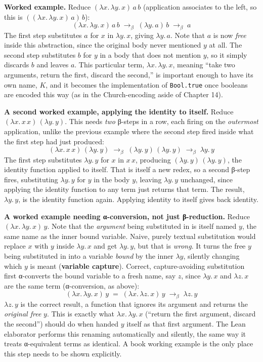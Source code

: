 \textbf{Worked example.} Reduce \((\lambda x.\, \lambda y.\, x)\, a\, b\) (application associates to the left, so this is \(((\lambda x.\, \lambda y.\, x)\, a)\, b\)): \[
(\lambda x.\, \lambda y.\, x)\, a\, b
\;\longrightarrow_\beta\; (\lambda y.\, a)\, b
\;\longrightarrow_\beta\; a
\] The first step substitutes \(a\) for \(x\) in \(\lambda y.\, x\), giving \(\lambda y.\, a\). Note that \(a\) is now \emph{free} inside this abstraction, since the original body never mentioned \(y\) at all. The second step substitutes \(b\) for \(y\) in a body that does not mention \(y\), so it simply discards \(b\) and leaves \(a\). This particular term, \(\lambda x.\, \lambda y.\, x\), meaning ``take two arguments, return the first, discard the second,'' is important enough to have its own name, \(K\), and it becomes the implementation of \texttt{Bool.true} once booleans are encoded this way (as in the Church-encoding aside of Chapter 14).

\textbf{A second worked example, applying the identity to itself.} Reduce \((\lambda x.\, x\, x)\, (\lambda y.\, y)\). This needs \emph{two} β-steps in a row, each firing on the \emph{outermost} application, unlike the previous example where the second step fired inside what the first step had just produced: \[
(\lambda x.\, x\, x)\, (\lambda y.\, y)
\;\longrightarrow_\beta\; (\lambda y.\, y)\, (\lambda y.\, y)
\;\longrightarrow_\beta\; \lambda y.\, y
\] The first step substitutes \(\lambda y.\, y\) for \(x\) in \(x\, x\), producing \((\lambda y.\, y)\, (\lambda y.\, y)\), the identity function applied to itself. That is itself a new redex, so a second β-step fires, substituting \(\lambda y.\, y\) for \(y\) in the body \(y\), leaving \(\lambda y.\, y\) unchanged, since applying the identity function to any term just returns that term. The result, \(\lambda y.\, y\), is the identity function again. Applying identity to itself gives back identity.

\textbf{A worked example needing α-conversion, not just β-reduction.} Reduce \((\lambda x.\, \lambda y.\, x)\, y\). Note that the \emph{argument} being substituted in is itself named \(y\), the same name as the inner bound variable. Naive, purely textual substitution would replace \(x\) with \(y\) inside \(\lambda y.\, x\) and get \(\lambda y.\, y\), but that is \emph{wrong}. It turns the free \(y\) being substituted in into a variable \emph{bound} by the inner \(\lambda y\), silently changing which \(y\) is meant (\textbf{variable capture}). Correct, capture-avoiding substitution first α-converts the bound variable to a fresh name, say \(z\), since \(\lambda y.\, x\) and \(\lambda z.\, x\) are the same term (α-conversion, as above): \[
(\lambda x.\, \lambda y.\, x)\, y
\;=\; (\lambda x.\, \lambda z.\, x)\, y
\;\longrightarrow_\beta\; \lambda z.\, y
\] \(\lambda z.\, y\) is the correct result, a function that ignores its argument and returns the \emph{original free} \(y\). This is exactly what \(\lambda x.\, \lambda y.\, x\) (``return the first argument, discard the second'') should do when handed \(y\) itself as that first argument. The Lean elaborator performs this renaming automatically and silently, the same way it treats α-equivalent terms as identical. A book working example is the only place this step needs to be shown explicitly.

